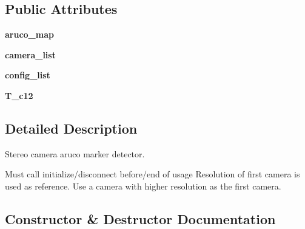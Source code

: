 \subsection*{Public Attributes}
\begin{DoxyCompactItemize}
\item 
\mbox{\label{classrnb-planning_1_1src_1_1pkg_1_1detector_1_1aruco_1_1stereo_1_1_aruco_stereo_adb24fdd9abcbcbd4dc195266cd286e9e}} 
{\bfseries aruco\+\_\+map}
\item 
\mbox{\label{classrnb-planning_1_1src_1_1pkg_1_1detector_1_1aruco_1_1stereo_1_1_aruco_stereo_ad477a6fc24f7cc9989baa36a92e5a522}} 
{\bfseries camera\+\_\+list}
\item 
\mbox{\label{classrnb-planning_1_1src_1_1pkg_1_1detector_1_1aruco_1_1stereo_1_1_aruco_stereo_a80f576a56f8614e5a7768cc5baf0abc6}} 
{\bfseries config\+\_\+list}
\item 
\mbox{\label{classrnb-planning_1_1src_1_1pkg_1_1detector_1_1aruco_1_1stereo_1_1_aruco_stereo_a706dbd162f9d4432886837a5cd60d116}} 
{\bfseries T\+\_\+c12}
\end{DoxyCompactItemize}


\subsection{Detailed Description}
Stereo camera aruco marker detector. 

Must call initialize/disconnect before/end of usage Resolution of first camera is used as reference. Use a camera with higher resolution as the first camera. 

\subsection{Constructor \& Destructor Documentation}
\mbox{\label{classrnb-planning_1_1src_1_1pkg_1_1detector_1_1aruco_1_1stereo_1_1_aruco_stereo_a1e91f693d833c520d3aef84035938616}} 

